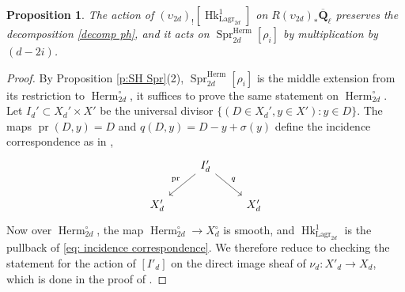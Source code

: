 \documentclass[reqno]{amsart}
\numberwithin{equation}{section}
\newcommand{\Q}{\mathbf{Q}}
\newcommand{\co}{\colon}
\DeclareMathOperator{\pr}{pr}
\DeclareMathOperator{\Hk}{Hk}
\DeclareMathOperator{\Herm}{Herm}
\DeclareMathOperator{\Lagr}{Lagr}
\DeclareMathOperator{\Spr}{Spr}
\newcommand{\Qlbar}{\overline{\Q}_\ell}
\renewcommand\c{\circ}
\renewcommand{\r}{\rho}
\newtheorem{prop}[thm]{Proposition}
\theoremstyle{remark}
\numberwithin{equation}{section}
\begin{document}
\begin{prop}\label{p:action Hk1} The action of $(\upsilon_{2d})_{!}[\Hk^{1}_{\Lagr_{2d}}]$ on $R(\upsilon_{2d})_{*}\Qlbar$ preserves the decomposition \eqref{decomp ph},  and it acts on $\Spr^{\Herm}_{2d}[\r_{i}]$ by multiplication by $(d-2i)$.
\end{prop}
\begin{proof}By Proposition \ref{p:SH Spr}(2),  $\Spr^{\Herm}_{2d}[\r_{i}]$ is the middle extension from its restriction to $\Herm^{\c}_{2d}$, it suffices to prove the same statement on $\Herm_{2d}^{\c}$. Let $I_d' \subset X_d' \times X'$ be the universal divisor $\{(D \in X_d', y \in X') \co y \in D\}$. The maps $\pr(D,y) = D$ and $q(D,y) = D-y+\sigma(y)$ define the incidence correspondence as in \cite[proof of Proposition 8.3]{YZ},
\begin{equation}\label{eq: incidence correspondence}
\begin{tikzcd}
& I_d' \ar[dl, "\pr"'] \ar[dr, "q"] \\
X_d'  & & X_d' 
\end{tikzcd}
\end{equation}
Now over $\Herm_{2d}^{\c}$, the map $\Herm_{2d}^{\c}\to X^{\c}_{d}$ is smooth, and $\Hk^{1}_{\Lagr_{2d}}$ is the pullback of \eqref{eq: incidence correspondence}. We therefore reduce to checking the statement for the action of $[I'_{d}]$ on the direct image sheaf of $\nu_{d}: X'_{d}\to X_{d}$, which is done in the proof of \cite[Proposition 8.3]{YZ}.
\end{proof}
\end{document}

